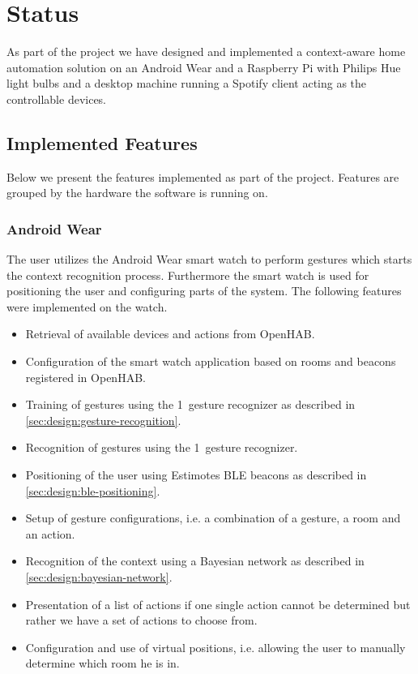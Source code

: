 \section{Status}
\label{sec:implementation:status}

As part of the project we have designed and implemented a context-aware home automation solution on an Android Wear and a Raspberry Pi with Philips Hue light bulbs and a desktop machine running a Spotify client acting as the controllable devices. 


\subsection{Implemented Features}

Below we present the features implemented as part of the project. Features are grouped by the hardware the software is running on.

\subsubsection{Android Wear}

The user utilizes the Android Wear smart watch to perform gestures which starts the context recognition process. Furthermore the smart watch is used for positioning the user and configuring parts of the system. The following features were implemented on the watch.

\begin{itemize}
\item Retrieval of available devices and actions from OpenHAB.
\item Configuration of the smart watch application based on rooms and beacons registered in OpenHAB.
\item Training of gestures using the 1\textcent~gesture recognizer as described in \cref{sec:design:gesture-recognition}.
\item Recognition of gestures using the 1\textcent~gesture recognizer.
\item Positioning of the user using Estimotes BLE beacons as described in \cref{sec:design:ble-positioning}.
\item Setup of gesture configurations, i.e. a combination of a gesture, a room and an action.
\item Recognition of the context using a Bayesian network as described in \cref{sec:design:bayesian-network}.
\item Presentation of a list of actions if one single action cannot be determined but rather we have a set of actions to choose from.
\item Configuration and use of virtual positions, i.e. allowing the user to manually determine which room he is in.
\end{itemize}

